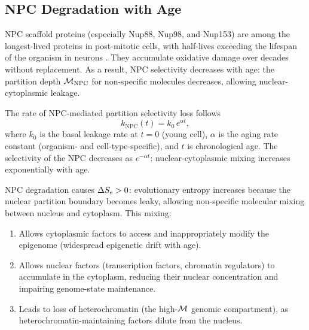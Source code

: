 \subsection{NPC Degradation with Age}
\label{ssec:npc_degradation}

NPC scaffold proteins (especially Nup88, Nup98, and Nup153) are among the
longest-lived proteins in post-mitotic cells, with half-lives exceeding the
lifespan of the organism in neurons \citep{Savas2012}. They accumulate
oxidative damage over decades without replacement. As a result, NPC selectivity
decreases with age: the partition depth $\mathcal{M}_{\mathrm{NPC}}$ for non-specific
molecules decreases, allowing nuclear-cytoplasmic leakage.

\begin{definition}
\label{def:npc_degradation}
The rate of NPC-mediated partition selectivity loss follows
\begin{equation}
  k_{\mathrm{NPC}}(t) = k_0\,e^{\alpha t},
  \label{eq:npc_degradation}
\end{equation}
where $k_0$ is the basal leakage rate at $t = 0$ (young cell), $\alpha$ is
the aging rate constant (organism- and cell-type-specific), and $t$ is
chronological age. The selectivity of the NPC decreases as $e^{-\alpha t}$:
nuclear-cytoplasmic mixing increases exponentially with age.
\end{definition}

\begin{proposition}
\label{prop:aging_se}
NPC degradation causes $\Delta S_e > 0$: evolutionary entropy increases because
the nuclear partition boundary becomes leaky, allowing non-specific molecular
mixing between nucleus and cytoplasm. This mixing:
\begin{enumerate}[label=(\roman*)]
  \item Allows cytoplasmic factors to access and inappropriately modify
        the epigenome (widespread epigenetic drift with age).
  \item Allows nuclear factors (transcription factors, chromatin regulators)
        to accumulate in the cytoplasm, reducing their nuclear concentration
        and impairing genome-state maintenance.
  \item Leads to loss of heterochromatin (the high-$\mathcal{M}$ genomic
        compartment), as heterochromatin-maintaining factors dilute from
        the nucleus.
\end{enumerate}
\end{proposition}

